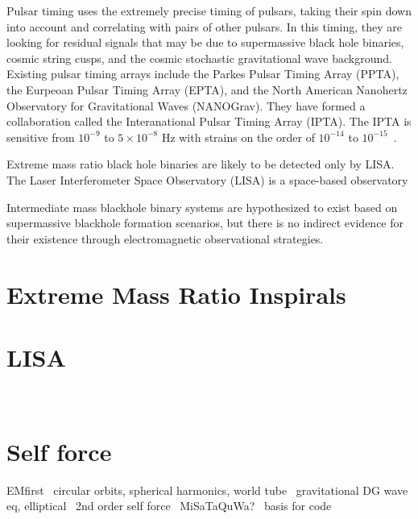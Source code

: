 Pulsar timing uses the extremely precise timing of pulsars, taking their spin down into account and correlating with pairs of other pulsars. In this timing, they are looking for residual signals that may be due to supermassive black hole binaries, cosmic string cusps, and the cosmic stochastic gravitational wave background. Existing pulsar timing arrays include the Parkes Pulsar Timing Array (PPTA), the Eurpeoan Pulsar Timing Array (EPTA), and the North American Nanohertz Observatory for Gravitational Waves (NANOGrav). They have formed a collaboration called the Interanational Pulsar Timing Array (IPTA). The IPTA is sensitive from $10^{-9}$ to $5\times10^{-8}$ Hz with strains on the order of $10^{-14}$ to $10^{-15}$~\cite{hobbs_dai}.

Extreme mass ratio black hole binaries are likely to be detected only by LISA. The Laser Interferometer Space Observatory (LISA) is a space-based observatory

Intermediate mass blackhole binary systems are hypothesized to exist based on supermassive blackhole formation scenarios, but there is no indirect evidence for their existence through electromagnetic observational strategies. 







\section{Extreme Mass Ratio Inspirals}
\section{LISA}
~\cite{LISA02062017}
~\cite{LISAscienceMarch28_2017}
~\cite{ELISAz}
~\cite{eLISAastrophysicsSelfForce}
\section{Self force}
EMfirst~\cite{dirac1938}
circular orbits, spherical harmonics, world tube~\cite{wardell_vega_thornberg_diener}
gravitational DG wave eq, elliptical~\cite{time_dependent_coordinate_transform}
2nd order self force~\cite{pound2ndOrderSelfForce0}
MiSaTaQuWa?~\cite{minosasakitanaka}
basis for code~\cite{heffernan_ottewil_wardell_modesum_basisForCode}



